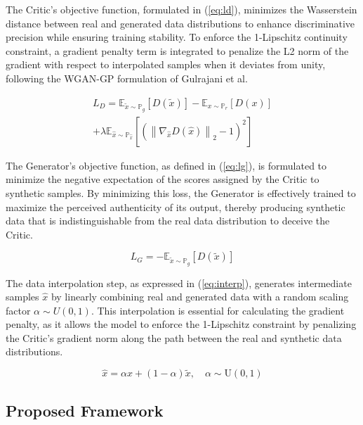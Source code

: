 \documentclass[conference]{IEEEtran}
\begin{document}
The Critic's objective function, formulated in (\ref{eq:ld}), minimizes the Wasserstein distance between real and generated data distributions to enhance discriminative precision while ensuring training stability. To enforce the 1-Lipschitz continuity constraint, a gradient penalty term is integrated to penalize the L2 norm of the gradient with respect to interpolated samples when it deviates from unity, following the WGAN-GP formulation of Gulrajani et al.\cite{b39}

\begin{multline}\label{eq:ld}
L_{D} = \mathbb{E}_{\widetilde{x} \sim \mathbb{P}_{g}}\left\lbrack D\left( \widetilde{x} \right) \right\rbrack - \mathbb{E}_{x \sim \mathbb{P}_{r}}\left\lbrack D(x) \right\rbrack \\
+ \lambda\mathbb{E}_{\widehat{x} \sim \mathbb{P}_{\widehat{x}}}\left\lbrack \left( \left\lVert \nabla_{\widehat{x}}D\left( \widehat{x} \right) \right\rVert_{2} - 1 \right)^{2} \right\rbrack
\end{multline}

The Generator's objective function, as defined in (\ref{eq:lg}), is formulated to minimize the negative expectation of the scores assigned by the Critic to synthetic samples. By minimizing this loss, the Generator is effectively trained to maximize the perceived authenticity of its output, thereby producing synthetic data that is indistinguishable from the real data distribution to deceive the Critic.

\begin{equation}\label{eq:lg}
L_{G} = - \mathbb{E}_{\widetilde{x} \sim \mathbb{P}_{g}}\left\lbrack D\left( \widetilde{x} \right) \right\rbrack
\end{equation}

The data interpolation step, as expressed in (\ref{eq:interp}), generates intermediate samples \(\widehat{x}\) by linearly combining real and generated data with a random scaling factor \(\alpha \sim U(0,1)\). This interpolation is essential for calculating the gradient penalty, as it allows the model to enforce the 1-Lipschitz constraint by penalizing the Critic's gradient norm along the path between the real and synthetic data distributions.

\begin{equation}\label{eq:interp}
\widehat{x} = \alpha x + (1 - \alpha)\widetilde{x},\quad\alpha \sim \text{U}(0,1)
\end{equation}

\subsection{Proposed Framework}\label{sec:framework}
\end{document}
